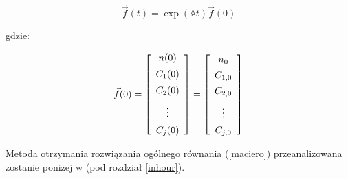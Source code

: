\begin{equation}
	\vec{f}(t)=\exp(\mathbb{A}t)\vec{f}(0)
	\label{jednorozw}
\end{equation}

\noindent gdzie:

\begin{equation}
	\vec{f}(0)=\left[\begin{array}{c}
		n(0)\\
		\uu{C_1(0)}\\
		\uu{ C_2(0)}\\
		\uu{\vdots}\\
		\uu{C_j(0)}
	\end{array}\right]
	=\left[\begin{array}{c}
		\uu{n_0}\\
		\uu{C_{1,0}}\\
		\uu{ C_{2,0}}\\
		\uu{\vdots}\\
		\uu{C_{j,0}}
	\end{array}\right]
	\label{fzero}
\end{equation}

\noindent Metoda otrzymania rozwiązania ogólnego równania (\ref{maciero}) przeanalizowana zostanie poniżej w  (pod rozdział \ref{inhour}).


